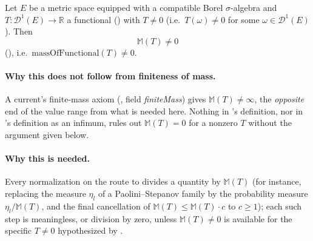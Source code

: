 \begin{lemma}
  Let $E$ be a metric space equipped with a compatible Borel $\sigma$-algebra and $T \colon
  \mathcal{D}^1(E) \to \mathbb{R}$ a functional () with $T \ne 0$ (i.e.\ $T(\omega)
  \ne 0$ for some $\omega\in\mathcal{D}^1(E)$). Then
  \[
    \mathbb{M}(T) \ne 0
  \]
  (), i.e.\ $\mathrm{massOfFunctional}(T) \ne 0$.

  \paragraph{Why this does not follow from finiteness of mass.} A current's finite-mass axiom
  (, field \emph{finiteMass}) gives $\mathbb{M}(T) \ne \infty$, the
  \emph{opposite} end of the value range from what is needed here. Nothing in
  's definition, nor in 's definition as an
  infimum, rules out $\mathbb{M}(T)=0$ for a nonzero $T$ without the argument given below.

  \paragraph{Why this is needed.} Every normalization on the route to  divides
  a quantity by $\mathbb{M}(T)$ (for instance, replacing the measure $\eta_l$ of a Paolini--Stepanov
  family by the probability measure $\eta_l/\mathbb{M}(T)$, and the final cancellation of
  $\mathbb{M}(T)\le\mathbb{M}(T)\cdot c$ to $c\ge 1$); each such step is meaningless, or division by
  zero, unless $\mathbb{M}(T)\ne 0$ is available for the specific $T\ne 0$ hypothesized by
  .
\end{lemma}

